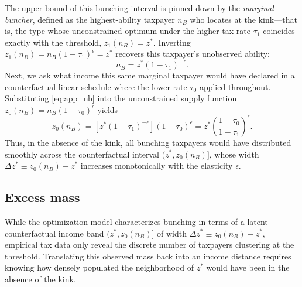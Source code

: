 The upper bound of this bunching interval is pinned down by the \emph{marginal buncher}, defined as the highest-ability taxpayer $n_B$ who locates at the kink---that is, the type whose unconstrained optimum under the higher tax rate $\tau_1$ coincides exactly with the threshold, $z_1(n_B) = z^*$. Inverting $z_1(n_B) = n_B(1-\tau_1)^{\epsilon} = z^*$ recovers this taxpayer's unobserved ability:
\begin{equation}
n_B = z^{*}(1-\tau_1)^{-\epsilon}.
\label{eq:app_nb}
\end{equation}
Next, we ask what income this same marginal taxpayer would have declared in a counterfactual linear schedule where the lower rate $\tau_0$ applied throughout. Substituting \eqref{eq:app_nb} into the unconstrained supply function $z_0(n_B) = n_B(1-\tau_0)^{\epsilon}$ yields
\begin{equation}
z_0(n_B) = \left[z^{*}(1-\tau_1)^{-\epsilon}\right](1-\tau_0)^{\epsilon} = z^{*}\left(\frac{1-\tau_0}{1-\tau_1}\right)^{\epsilon}.
\label{eq:app_buncher}
\end{equation}
Thus, in the absence of the kink, all bunching taxpayers would have distributed smoothly across the counterfactual interval $(z^*, z_0(n_B)]$, whose width $\Delta z^* \equiv z_0(n_B) - z^*$ increases monotonically with the elasticity $\epsilon$.


\subsection{Excess mass}
While the optimization model characterizes bunching in terms of a latent counterfactual income band $(z^*, z_0(n_B)]$ of width $\Delta z^* \equiv z_0(n_B) - z^*$, empirical tax data only reveal the discrete number of taxpayers clustering at the threshold. Translating this observed mass back into an income distance requires knowing how densely populated the neighborhood of $z^*$ would have been in the absence of the kink.

